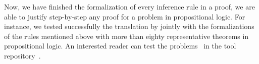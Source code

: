 \documentclass[../main.tex]{subfiles}
\begin{document}









Now, we have finished the formalization of every inference rule in
a \Metis proof, we are able to justify step-by-step any proof
for a problem in propositional logic.
For instance, we tested successfully the translation by \Athena jointly with
the \Agda formalizations of the rules mentioned above with more than eighty
representative theorems in propositional logic. An interested reader can test
the problems~\cite{Prieto-Cubides2017} in the \Athena tool
repository~\cite{Athena}.
\end{document}
